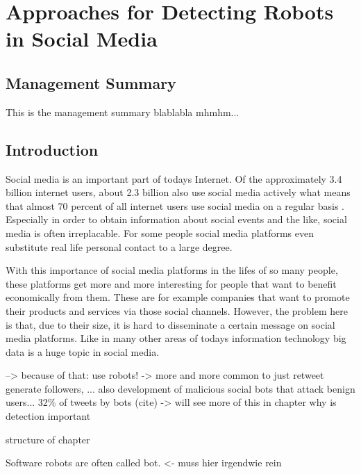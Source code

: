 \newpage
\chapter{Approaches for Detecting Robots \\ in Social Media}


\section*{Management Summary}
This is the management summary blablabla mhmhm...

\section{Introduction}
Social media is an important part of todays Internet.  Of the approximately 3.4 billion internet users, about 2.3 billion also use social media actively what means that almost 70 percent of all internet users use social media on a regular basis \cite{insight}. Especially in order to obtain information about social events and the like, social media is often irreplacable.  For some people social media platforms even substitute real life personal contact to a large degree.

With this importance of social media platforms in the lifes of so many people, these platforms get more and more interesting for people that want to benefit economically from them. These are for example companies that want to promote their products and services via those social channels. However, the problem here is that, due to their size, it is hard to disseminate a certain message on social media platforms. Like in many other areas of todays  information technology big data is a huge topic in social media.

--> because of that: use robots! -> more and more common to just retweet generate followers, ... also development of malicious social bots that attack benign users... 32\% of tweets by bots (cite) -> will see more of this  in chapter why is detection important

structure of chapter

Software robots are often called bot. <- muss hier irgendwie rein 


